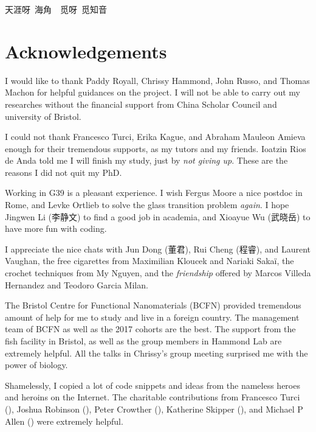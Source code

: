 \documentclass[11pt,twoside]{report}
\begin{document}
{\selectfont 
\Large{天涯呀~海角~~觅呀~觅知音}
}

\cleardoublepage



\cleardoublepage

\chapter*{Acknowledgements}

I would like to thank Paddy Royall, Chrissy Hammond, John Russo, and Thomas Machon for helpful guidances on the project. I will not be able to carry out my researches  without the financial support from China Scholar Council and university of Bristol.


I could not thank Francesco Turci, Erika Kague, and Abraham Mauleon Amieva enough for their tremendous supports, as my tutors and my friends. Ioatzin Rios de Anda told me I will finish my study, just by \emph{not giving up}. These are the reasons I did not quit my PhD.


Working in G39 is a pleasant experience. I wish Fergus Moore a nice postdoc in Rome, and Levke Ortlieb to solve the glass transition problem \emph{again}. I hope Jingwen Li (李静文) to find a good job in academia, and Xioayue Wu (武晓岳) to have more fun with coding.

I appreciate the nice chats with Jun Dong (董君), Rui Cheng (程睿), and Laurent Vaughan, the free cigarettes from Maximilian Kloucek and Nariaki Sakaï, the crochet techniques from My Nguyen, and the \emph{friendship} offered by Marcos Villeda Hernandez and Teodoro Garcia Milan.

The Bristol Centre for Functional Nanomaterials (BCFN) provided tremendous amount of help for me to study and live in a foreign country. The management team of BCFN as well as the 2017 cohorts are the best. 
The support from the fish facility in Bristol, as well as the group members in Hammond Lab are extremely helpful. All the talks in Chrissy's group meeting surprised me with the power of biology.


Shamelessly, I copied a lot of code snippets and ideas from the nameless heroes and heroins on the Internet. The charitable contributions from Francesco Turci (), Joshua Robinson (), Peter Crowther (), Katherine Skipper (), and Michael P Allen () were extremely helpful.
\end{document}
